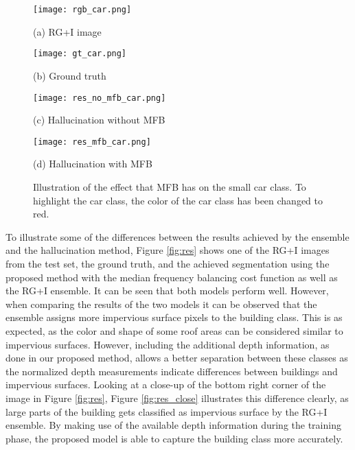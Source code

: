 \documentclass[journal]{IEEEtran}
\begin{document}
\begin{figure}[htbp]
\begin{minipage}[b]{0.48\linewidth}
  \centering
 \texttt{[image: rgb\_car.png]}
  \centerline{(a) RG+I image}\medskip
\end{minipage}
\hfill
\begin{minipage}[b]{0.48\linewidth}
  \centering
 \texttt{[image: gt\_car.png]}
  \centerline{(b) Ground truth}\medskip
\end{minipage}
\begin{minipage}[b]{0.48\linewidth}
  \centering
 \texttt{[image: res\_no\_mfb\_car.png]}
  \centerline{(c) Hallucination without MFB}\medskip
\end{minipage}
\hfill
\begin{minipage}[b]{0.48\linewidth}
  \centering
 \texttt{[image: res\_mfb\_car.png]}
  \centerline{(d) Hallucination with MFB}\medskip
\end{minipage}
%
\caption{Illustration of the effect that MFB has on the small car class. To highlight the car class, the color of the car class has been changed to red.}
\label{fig:res_mfb}
%
\end{figure}

To illustrate some of the differences between the results achieved by the ensemble and the hallucination method, Figure \ref{fig:res} shows one of the RG+I images from the test set, the ground truth, and the achieved segmentation using the proposed method with the median frequency balancing cost function  as well as the RG+I ensemble. It can be seen that both models perform well. However, when comparing the results of the two models it can be observed that the ensemble assigns more impervious surface pixels to the building class. This is as expected, as the color and shape of some roof areas can be considered similar to impervious surfaces. However, including the additional depth information, as done in our proposed method, allows a better separation between these classes as the normalized depth measurements indicate differences between buildings and impervious surfaces. Looking at a close-up of the bottom right corner of the image in Figure \ref{fig:res}, Figure \ref{fig:res_close} illustrates this difference clearly, as large parts of the building gets classified as impervious surface by the RG+I ensemble. By making use of the available depth information during the training phase, the proposed model is able to capture the building class more accurately.
\end{document}
